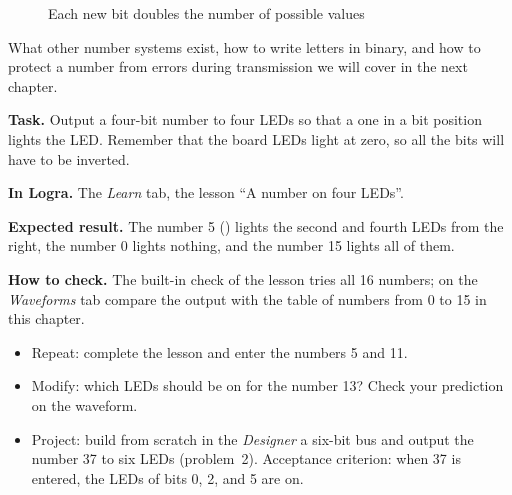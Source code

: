 \begin{figure}[H]
\centering
{}
\caption{Each new bit doubles the number of possible values}
\end{figure}

What other number systems exist, how to write letters in binary, and how to
protect a number from errors during transmission we will cover in the next
chapter.

\begin{diybox}
\textbf{Task.} Output a four-bit number to four LEDs so that a one in a bit
position lights the LED. Remember that the board LEDs light at zero, so all
the bits will have to be inverted.\par
\textbf{In Logra.} The \emph{Learn} tab, the lesson ``A number on four
LEDs''.\par
\textbf{Expected result.} The number 5 () lights the second and
fourth LEDs from the right, the number 0 lights nothing, and the number 15
lights all of them.\par
\textbf{How to check.} The built-in check of the lesson tries all 16
numbers; on the \emph{Waveforms} tab compare the output with the table of
numbers from 0 to 15 in this chapter.
\begin{itemize}[leftmargin=3.4em,labelwidth=3em,labelsep=0.4em,align=left]
  \item[\stars{1}] Repeat: complete the lesson and enter the numbers 5 and 11.
  \item[\stars{2}] Modify: which LEDs should be on for the number 13? Check
    your prediction on the waveform.
  \item[\stars{3}] Project: build from scratch in the \emph{Designer} a
    six-bit bus and output the number 37 to six LEDs (problem~2). Acceptance
    criterion: when 37 is entered, the LEDs of bits 0, 2, and 5 are on.
\end{itemize}
\end{diybox}

